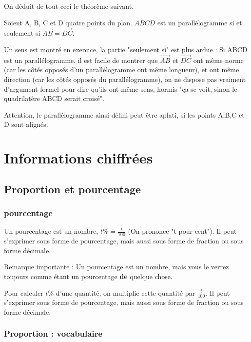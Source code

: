 \documentclass[10pt,a4paper,oneside]{book}
\begin{document}
On déduit de tout ceci le théorème suivant.

\begin{theo}
 Soient A, B, C et D quatre points du plan.  $ABCD$ est un parallélogramme si et seulement si $\overrightarrow{AB}=\overrightarrow{DC}$.
\end{theo}

Un sens est montré en exercice, la partie "seulement si" est plus ardue : Si ABCD est un parallélogramme, il est facile de montrer que $\overrightarrow{AB}$ et $\overrightarrow{DC}$ ont même norme (car les côtés opposés d'un parallélogramme ont même longueur), 
et ont même direction (car les côtés opposés du parallélogramme), on ne dispose pas vraiment d'argument formel pour dire qu'ils ont même sens, hormis "ça se voit, sinon le quadrilatère ABCD serait croisé".

Attention, le parallélogramme ainsi défini peut être aplati, si les points A,B,C et D sont alignés.


\chapter{Informations chiffrées}

\section{Proportion et pourcentage}

\subsection{pourcentage}

\begin{de}
  Un pourcentage est un nombre, $t\% = \frac{t}{100}$  (On prononce "t pour cent"). Il peut s'exprimer sous forme de pourcentage, mais aussi sous forme de fraction ou sous forme décimale.
\end{de}

Remarque importante : Un pourcentage est un nombre, mais vous le verrez toujours comme étant un pourcentage \textbf{de} quelque chose. 

\begin{de}
  Pour calculer $t\%$ d'une quantité, on multiplie cette quantité par $\frac{t}{100}$. Il peut s'exprimer sous forme de pourcentage, mais aussi sous forme de fraction ou sous forme décimale.
\end{de}


\subsection{Proportion : vocabulaire}
\end{document}
